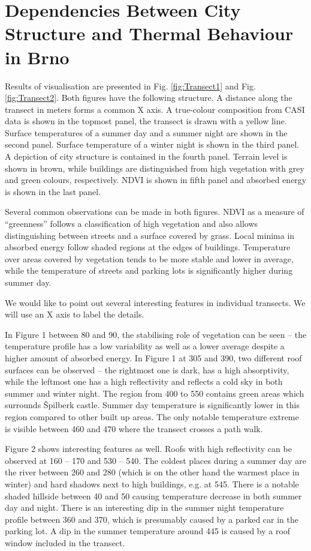 \chapter{Dependencies Between City Structure and Thermal Behaviour in Brno}
\label{app:Visualisation}

Results of visualisation are presented in Fig. \ref{fig:Transect1} and Fig. \ref{fig:Transect2}. Both figures have the following structure. A distance along the transect in meters forms a common X axis. A true-colour composition from CASI data is shown in the topmost panel, the transect is drawn with a yellow line. Surface temperatures of a summer day and a summer night are shown in the second panel. Surface temperature of a winter night is shown in the third panel. A depiction of city structure is contained in the fourth panel. Terrain level is shown in brown, while buildings are distinguished from high vegetation with grey and green colours, respectively. NDVI is shown in fifth panel and absorbed energy is shown in the last panel.

Several common observations can be made in both figures. NDVI as a measure of “greenness” follows a classification of high vegetation and also allows distinguishing between streets and a surface covered by grass. Local minima in absorbed energy follow shaded regions at the edges of buildings. Temperature over areas covered by vegetation tends to be more stable and lower in average, while the temperature of streets and parking lots is significantly higher during summer day.

We would like to point out several interesting features in individual transects. We will use an X axis to label the details.

In Figure 1 between 80 and 90, the stabilising role of vegetation can be seen – the temperature profile has a low variability as well as a lower average despite a higher amount of absorbed energy. In Figure 1 at 305 and 390, two different roof surfaces can be observed – the rightmost one is dark, has a high absorptivity, while the leftmost one has a high reflectivity and reflects a cold sky in both summer and winter night. The region from 400 to 550 contains green areas which surrounds Špilberk castle. Summer day temperature is significantly lower in this region compared to other built up areas. The only notable temperature extreme is visible between 460 and 470 where the transect crosses a path walk.

Figure 2 shows interesting features as well. Roofs with high reflectivity can be observed at 160 – 170 and 530 – 540. The coldest places during a summer day are the river between 260 and 280 (which is on the other hand the warmest place in winter) and hard shadows next to high buildings, e.g. at 545. There is a notable shaded hillside between 40 and 50 causing temperature decrease in both summer day and night. There is an interesting dip in the summer night temperature profile between 360 and 370, which is presumably caused by a parked car in the parking lot. A dip in the summer temperature around 445 is caused by a roof window included in the transect.


